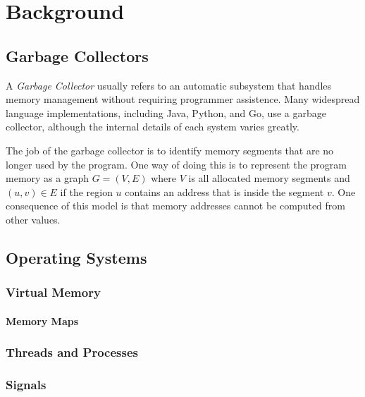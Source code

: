 \chapter{Background}


\section{Garbage Collectors}

A \emph{Garbage Collector} usually refers to an automatic subsystem that handles memory management
without requiring programmer assistence. Many widespread language implementations,
including Java, Python, and Go, use a garbage collector, although the internal details of each
system varies greatly.

The job of the garbage collector is to identify memory segments that are no longer used by the
program. One way of doing this is to represent the program memory as a graph $G=(V, E)$ where $V$ is
all allocated memory segments and $(u, v) \in E$ if the region $u$ contains an address that is
inside the segment $v$. One consequence of this model is that memory addresses cannot be computed
from other values.



\section{Operating Systems}
\lorem{}

\subsection{Virtual Memory}
\lorem{}

\subsubsection{Memory Maps\label{sec:memory-map}}
\lorem{}


\subsection{Threads and Processes}
\lorem{}


\subsection{Signals\label{sec:background-signals}}
\lorem{}


